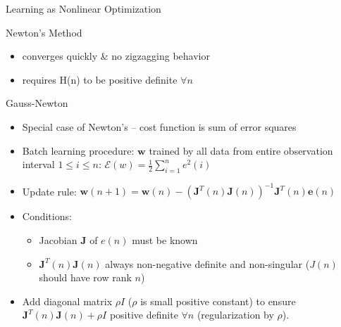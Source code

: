 \documentclass[9pt,t]{beamer}
\begin{document}
\begin{frame}{Learning as Nonlinear Optimization}
    \begin{alertblock}{Newton's Method}
        \begin{itemize}
            \item converges quickly \& no zigzagging behavior
            \item requires H(n) to be positive definite $ \forall n $
        \end{itemize}
    \end{alertblock}
    \begin{alertblock}{Gauss-Newton}
        \begin{itemize}
            \item Special case of Newton's -- cost function is sum of error squares
            \item Batch learning procedure: $ \mathbf{w} $ trained by all data from entire observation interval $ 1 \leq i \leq n $: $ \mathcal{E}(w) = \frac{1}{2} \sum_{i=1}^{n} e^2(i) $
            \item Update rule:
            $ \mathbf{w}(n+1) = \mathbf{w}(n) - (\mathbf{J}^T(n) \mathbf{J}(n))^{-1}\mathbf{J}^T(n) \mathbf{e}(n) $
            \item Conditions:
            \begin{itemize}
                \item Jacobian $ \mathbf{J} $ of $ e(n) $ must be known
                \item $ \mathbf{J}^T(n) \mathbf{J}(n) $ always non-negative definite and non-singular ($ J(n) $ should have row rank $ n $)
            \end{itemize}
            \item Add diagonal matrix $ \rho I $ ($ \rho $ is small positive constant) to ensure $ \mathbf{J}^T(n) \mathbf{J}(n) + \rho I $ positive definite $ \forall n $ (regularization by $ \rho $).
        \end{itemize}
    \end{alertblock}
\end{frame}
\end{document}
